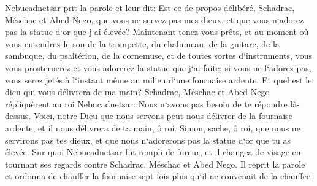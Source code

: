 \verse Nebucadnetsar prit la parole et leur dit: Est-ce de propos délibéré, Schadrac, Méschac et Abed Nego, que vous ne servez pas mes dieux, et que vous n`adorez pas la statue d`or que j`ai élevée? 
\verse Maintenant tenez-vous prêts, et au moment où vous entendrez le son de la trompette, du chalumeau, de la guitare, de la sambuque, du psaltérion, de la cornemuse, et de toutes sortes d`instruments, vous vous prosternerez et vous adorerez la statue que j`ai faite; si vous ne l`adorez pas, vous serez jetés à l`instant même au milieu d`une fournaise ardente. Et quel est le dieu qui vous délivrera de ma main? 
\verse Schadrac, Méschac et Abed Nego répliquèrent au roi Nebucadnetsar: Nous n`avons pas besoin de te répondre là-dessus. 
\verse Voici, notre Dieu que nous servons peut nous délivrer de la fournaise ardente, et il nous délivrera de ta main, ô roi. 
\verse Simon, sache, ô roi, que nous ne servirons pas tes dieux, et que nous n`adorerons pas la statue d`or que tu as élevée. 
\verse Sur quoi Nebucadnetsar fut rempli de fureur, et il changea de visage en tournant ses regards contre Schadrac, Méschac et Abed Nego. Il reprit la parole et ordonna de chauffer la fournaise sept fois plus qu`il ne convenait de la chauffer. 
